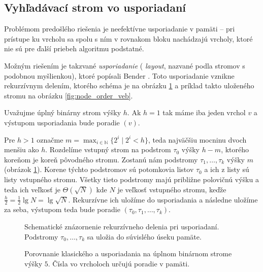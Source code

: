 \subsection{Vyhľadávací strom vo  usporiadaní} \label{sec:static-obliv}
Problémom predošlého riešenia je neefektívne usporiadanie v pamäti -- pri prístupe ku vrcholu sa spolu s ním v rovnakom bloku nachádzajú vrcholy, ktoré nie sú pre ďalší priebeh algoritmu podstatné. 

Možným riešením je takzvané  \emph{usporiadanie} (\vEB{} \emph{layout}, nazvané podla  stromov s podobnou myšlienkou), ktoré popísali Bender \etal\citep{btreeshort, btreefull}. Toto usporiadanie vznikne rekurzívnym delením, ktorého schéma je na obrázku \ref{fig:veblayout_scheme} a príklad takto uloženého stromu na obrázku \ref{fig:node_order_veb}.

Uvažujme úplný binárny strom výšky $h$. Ak $h=1$ tak máme iba jeden vrchol $v$ a výstupom usporiadania bude poradie $(v)$.

Pre $h>1$ označme $m = \max_{i\in\mathbb{N}}\{2^i \mid 2^i < h\}$, teda najväčšiu mocninu dvoch menšiu ako $h$. Rozdelíme vstupný strom na podstrom $\tau_0$ výšky $h-m$, ktorého koreňom je koreň pôvodného stromu. Zostanú nám podstromy $\tau_1,\dotsc,\tau_k$ výšky $m$ (obrázok \ref{fig:veblayout_scheme}). Korene týchto podstromov sú potomkovia listov $\tau_0$ a ich z listy sú listy vstupného stromu. Všetky tieto podstromy majú približne polovičnú výšku a teda ich veľkosť je $\Theta(\sqrt{N})$ kde $N$ je veľkosť vstupného stromu, keďže $\frac{h}{2} = \frac{1}{2}\lg{N} = \lg{\sqrt{N}}$. Rekurzívne ich uložíme do  usporiadania a následne uložíme za seba, výstupom teda bude poradie $(\tau_0,\tau_1,\dotsc,\tau_k)$.

\begin{figure}
    \centering
    \resizebox{0.9\textwidth}{!}{
        
    }
    \caption[Schematické znázornenie rekurzívneho delenia]{Schematické znázornenie rekurzívneho delenia pri  usporiadaní. Podstromy $\tau_0,\dotsc,\tau_k$ sa uložia do súvislého úseku pamäte.}
    \label{fig:veblayout_scheme}
\end{figure}

\begin{figure}
    \centering
    \caption[Porovnanie klasického a  usporiadania]{Porovnanie klasického a  usporiadania na úplnom binárnom strome výšky $5$. Čísla vo vrcholoch určujú poradie v pamäti.}
    \label{fig:node_order_comparison}
\end{figure}

